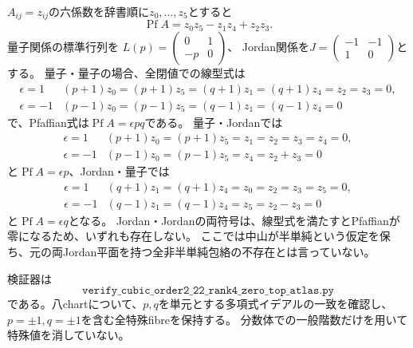 $A_{ij}=z_{ij}$の六係数を辞書順に$z_0,\ldots,z_5$とすると
\[
 \operatorname{Pf}A=z_0z_5-z_1z_4+z_2z_3.
\]
量子関係の標準行列を
$L(p)=\left(\begin{smallmatrix}0&1\\-p&0\end{smallmatrix}\right)$、
Jordan関係を$J=\left(\begin{smallmatrix}-1&-1\\1&0\end{smallmatrix}\right)$とする。
量子・量子の場合、全閉値での線型式は
\[
\begin{array}{c|l}
\epsilon=1&(p+1)z_0=(p+1)z_5=(q+1)z_1=(q+1)z_4=z_2=z_3=0,\\
\epsilon=-1&(p-1)z_0=(p-1)z_5=(q-1)z_1=(q-1)z_4=0
\end{array}
\]
で、Pfaffian式は$\operatorname{Pf}A=\epsilon pq$である。
量子・Jordanでは
\[
\begin{array}{c|l}
\epsilon=1&(p+1)z_0=(p+1)z_5=z_1=z_2=z_3=z_4=0,\\
\epsilon=-1&(p-1)z_0=(p-1)z_5=z_4=z_2+z_3=0
\end{array}
\]
と$\operatorname{Pf}A=\epsilon p$、Jordan・量子では
\[
\begin{array}{c|l}
\epsilon=1&(q+1)z_1=(q+1)z_4=z_0=z_2=z_3=z_5=0,\\
\epsilon=-1&(q-1)z_1=(q-1)z_4=z_5=z_2-z_3=0
\end{array}
\]
と$\operatorname{Pf}A=\epsilon q$となる。
Jordan・Jordanの両符号は、線型式を満たすとPfaffianが零になるため、いずれも存在しない。
ここでは中山が半単純という仮定を保ち、元の両Jordan平面を持つ全非半単純包絡の不存在とは言っていない。

検証器は
\[
 \texttt{verify\_cubic\_order2\_22\_rank4\_zero\_top\_atlas.py}
\]
である。八chartについて、$p,q$を単元とする多項式イデアルの一致を確認し、
$p=\pm1,q=\pm1$を含む全特殊fibreを保持する。
分数体での一般階数だけを用いて特殊値を消していない。
